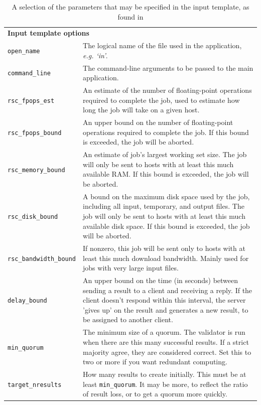 \begin{table} 
\caption{A selection of the parameters that may be specified in the input template, as found in \cite{boincwiki} }
\begin{tabular}{lp{11.5cm}}\toprule
\multicolumn{2}{l}{\textbf{Input template options }\cite{boincwiki} }\\ \cmidrule(r){1-2}
\verb|open_name| & The logical name of the file used in the application, \emph{e.g. `in'}.\\
\verb|command_line| & The command-line arguments to be passed to the main  application.  \\
\verb|rsc_fpops_est| &
An estimate of the number of floating-point operations required to complete the job, used to estimate how long the job will take on a given host.\\
\verb|rsc_fpops_bound| &
An upper bound on the number of floating-point operations required to complete the job. If this bound is exceeded, the job will be aborted.\\
\verb|rsc_memory_bound| &
An estimate of job's largest working set size. The job will only be sent to hosts with at least this much available RAM. If this bound is exceeded, the job will be aborted.
\\
\verb|rsc_disk_bound| &
A bound on the maximum disk space used by the job, including all input, temporary, and output files. The job will only be sent to hosts with at least this much available disk space. If this bound is exceeded, the job will be aborted.\\
\verb|rsc_bandwidth_bound| &
If nonzero, this job will be sent only to hosts with at least this much download bandwidth. Mainly used for jobs with very large input files. \\
\verb|delay_bound| &An upper bound on the time (in seconds) between sending a result to a client and receiving a reply.  If the client doesn't respond within this interval, the server 'gives up' on the result and generates a new result, to be assigned to another client.  
\\
\verb|min_quorum| &
The minimum size of a quorum. The validator is run when there are this many successful results. If a strict majority agree, they are considered correct. Set this to two or more if you want redundant computing.
\\
\verb|target_nresults| &
How many results to create initially. This must be at least \verb|min_quorum|. It may be more, to reflect the ratio of result loss, or to get a quorum more quickly.
\\

\end{tabular}
\end{table}
